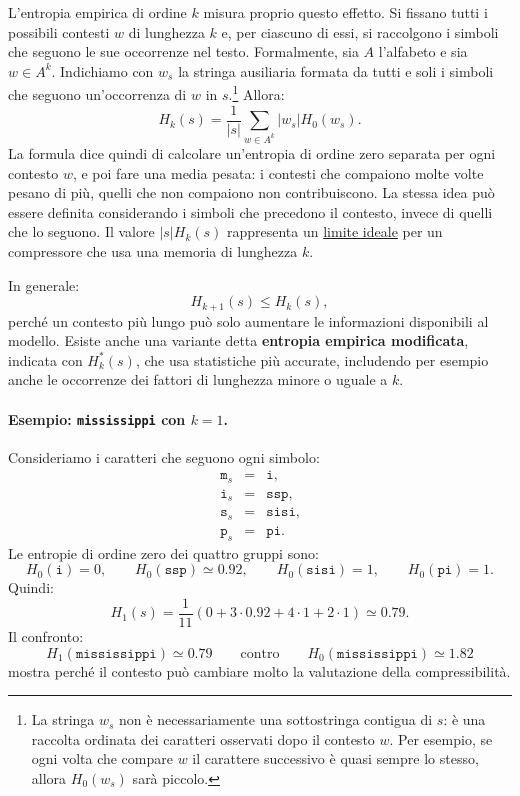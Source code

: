 \documentclass{article}
\theoremstyle{definition}
\numberwithin{equation}{section}
\begin{document}
L'entropia empirica di ordine $k$ misura proprio questo effetto. Si fissano tutti i possibili contesti $w$ di lunghezza $k$ e, per ciascuno di essi, si raccolgono i simboli che seguono le sue occorrenze nel testo. Formalmente, sia $A$ l'alfabeto e sia $w\in A^k$. Indichiamo con $w_s$ la stringa ausiliaria formata da tutti e soli i simboli che seguono un'occorrenza di $w$ in $s$.\footnote{La stringa $w_s$ non è necessariamente una sottostringa contigua di $s$: è una raccolta ordinata dei caratteri osservati dopo il contesto $w$. Per esempio, se ogni volta che compare $w$ il carattere successivo è quasi sempre lo stesso, allora $H_0(w_s)$ sarà piccolo.} Allora:
\begin{equation}\label{eq:k_order_empirical_entropy}
    H_k(s)
    =
    \frac{1}{|s|}
    \sum_{w\in A^k}
    |w_s|H_0(w_s).
\end{equation}
La formula dice quindi di calcolare un'entropia di ordine zero separata per ogni contesto $w$, e poi fare una media pesata: i contesti che compaiono molte volte pesano di più, quelli che non compaiono non contribuiscono. La stessa idea può essere definita considerando i simboli che precedono il contesto, invece di quelli che lo seguono. Il valore $|s|H_k(s)$ rappresenta un \uline{limite ideale} per un compressore che usa una memoria di lunghezza $k$.

In generale:
\begin{equation}\label{eq:empirical_entropy_monotonicity}
    H_{k+1}(s)\leq H_k(s),
\end{equation}
perché un contesto più lungo può solo aumentare le informazioni disponibili al modello. Esiste anche una variante detta \textbf{entropia empirica modificata}, indicata con $H_k^*(s)$, che usa statistiche più accurate, includendo per esempio anche le occorrenze dei fattori di lunghezza minore o uguale a $k$.

\paragraph{Esempio: \texttt{mississippi} con $k=1$.}
Consideriamo i caratteri che seguono ogni simbolo:
\[
    \begin{array}{rcl}
        \texttt{m}_s & = & \texttt{i},    \\
        \texttt{i}_s & = & \texttt{ssp},  \\
        \texttt{s}_s & = & \texttt{sisi}, \\
        \texttt{p}_s & = & \texttt{pi}.
    \end{array}
\]
Le entropie di ordine zero dei quattro gruppi sono:
\[
    H_0(\texttt{i})=0,
    \qquad
    H_0(\texttt{ssp})\simeq 0.92,
    \qquad
    H_0(\texttt{sisi})=1,
    \qquad
    H_0(\texttt{pi})=1.
\]
Quindi:
\[
    H_1(s)
    =
    \frac{1}{11}(0+3\cdot 0.92+4\cdot 1+2\cdot 1)
    \simeq 0.79.
\]
Il confronto:
\[
    H_1(\texttt{mississippi})\simeq 0.79
    \qquad
    \text{contro}
    \qquad
    H_0(\texttt{mississippi})\simeq 1.82
\]
mostra perché il contesto può cambiare molto la valutazione della compressibilità.
\end{document}
